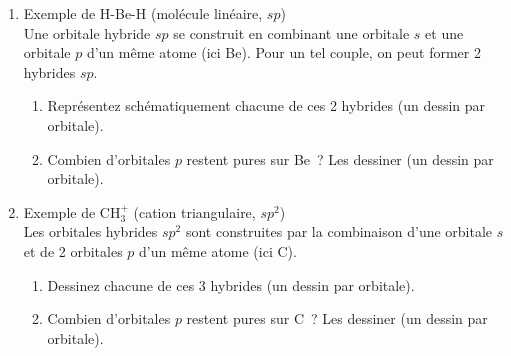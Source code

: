 \begin{enumerate}[\bf 1)]
\item Exemple de H-Be-H (mol\'ecule lin\'eaire, $sp$)\\
Une orbitale hybride $sp$ se construit en combinant une orbitale $s$ et une orbitale $p$ d'un m\^eme atome (ici Be). 
Pour un tel couple, on peut former 2 hybrides $sp$.
\begin{enumerate}
\item Repr\'esentez sch\'ematiquement chacune de ces 2 hybrides (un dessin par orbitale).
\item Combien d'orbitales $p$ restent pures sur Be~?
Les dessiner (un dessin par orbitale).
\end{enumerate}
\item Exemple de CH$_3^+$ (cation triangulaire, $sp^2$)\\
Les orbitales hybrides $sp^2$ sont construites par la combinaison d'une orbitale $s$ et de 2 orbitales $p$ d'un m\^eme atome (ici C).
\begin{enumerate}
\item Dessinez chacune de ces 3 hybrides (un dessin par orbitale).
\item Combien d'orbitales $p$ restent pures sur C~?
Les dessiner (un dessin par orbitale).
\end{enumerate}
\end{enumerate}
